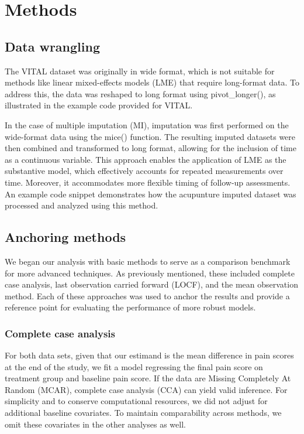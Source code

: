 \documentclass{article}
\begin{document}
\section{Methods}\label{methods}

\subsection{Data wrangling}\label{data-wrangling}

The VITAL dataset was originally in wide format, which is not suitable
for methods like linear mixed-effects models (LME) that require
long-format data. To address this, the data was reshaped to long format
using pivot\_longer(), as illustrated in the example code provided for
VITAL.

In the case of multiple imputation (MI), imputation was first performed
on the wide-format data using the mice() function. The resulting imputed
datasets were then combined and transformed to long format, allowing for
the inclusion of time as a continuous variable. This approach enables
the application of LME as the substantive model, which effectively
accounts for repeated measurements over time. Moreover, it accommodates
more flexible timing of follow-up assessments. An example code snippet
demonstrates how the acupunture imputed dataset was processed and
analyzed using this method.

\subsection{Anchoring methods}\label{anchoring-methods}

We began our analysis with basic methods to serve as a comparison
benchmark for more advanced techniques. As previously mentioned, these
included complete case analysis, last observation carried forward
(LOCF), and the mean observation method. Each of these approaches was
used to anchor the results and provide a reference point for evaluating
the performance of more robust models.

\subsubsection{Complete case analysis}\label{complete-case-analysis}

For both data sets, given that our estimand is the mean difference in
pain scores at the end of the study, we fit a model regressing the final
pain score on treatment group and baseline pain score. If the data are
Missing Completely At Random (MCAR), complete case analysis (CCA) can
yield valid inference. For simplicity and to conserve computational
resources, we did not adjust for additional baseline covariates. To
maintain comparability across methods, we omit these covariates in the
other analyses as well.
\end{document}
